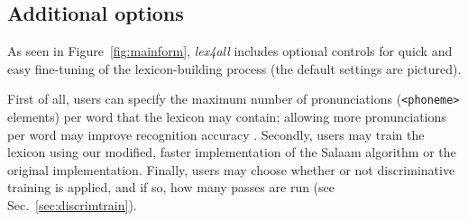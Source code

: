 \documentclass[11pt]{article}
\begin{document}



\subsection{Additional options}
\label{sec:options}
As seen in Figure~\ref{fig:mainform}, \textit{lex4all} includes
optional controls for quick and easy fine-tuning of the lexicon-building process (the default settings are pictured).

First of all, users
can specify the maximum number of pronunciations (\texttt{<phoneme>} elements) per word that the lexicon may contain;
allowing more pronunciations per word may 
improve recognition accuracy \cite{Qiao10,Chan12}.
Secondly, users may train the lexicon using our modified, %
faster implementation of the Salaam algorithm or the original implementation.
Finally, 
users may choose whether or not discriminative training 
is applied, and if so, how many passes are run (see Sec.~\ref{sec:discrimtrain}).

\end{document}
